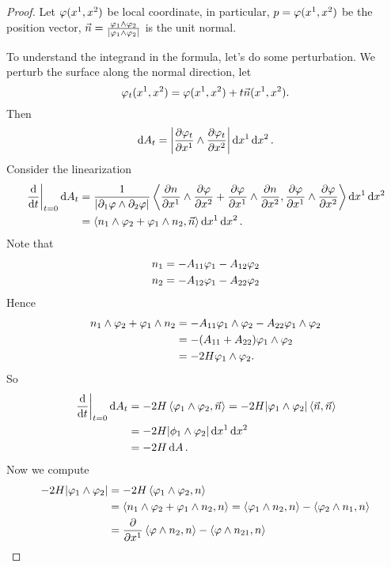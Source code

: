 \begin{proof}
    Let \(\varphi(x^1,x^2)\) be local coordinate, in particular, \(p=\varphi(x^1,x^2)\)
    be the position vector, \(\vec{n}=\frac{\varphi_1\wedge \varphi_2}{|\varphi_1\wedge
    \varphi_2|}\) is the unit normal.

    To understand the integrand in the formula, let's do some perturbation. We perturb
    the surface along the normal direction, let \[
        \varphi_t(x^1,x^2)=\varphi(x^1,x^2)+t\vec{n}(x^1,x^2)
    .\] Then \[
        \dd{A_t}=\left|\pdv{\varphi_t}{x^1}\wedge \pdv{\varphi_t}{x^2}\right|
        \dd{x^1}\dd{x^2}
    .\] Consider the linearization 
    \begin{align*}
        \eval{\dv{t}}_{t=0}\dd{A_t}&=\frac{1}{|\partial_1\vphi\wedge \partial_2\vphi|}
        \left<\pdv{n}{x^1}\wedge \pdv{\vphi}{x^2}+\pdv{\vphi}{x^1}\wedge \pdv{n}{x^2},
        \pdv{\vphi}{x^1}\wedge \pdv{\vphi}{x^2}\right> \dd{x^1}\dd{x^2} \\
        &=\left<n_1\wedge \vphi_2+\vphi_1\wedge n_2,\vec{n}\right> \dd{x^1}\dd{x^2}
    .\end{align*}
    Note that \begin{gather*}
        n_1=-A_{11}\varphi_1-A_{12}\varphi_2 \\
        n_2=-A_{12}\varphi_1-A_{22}\varphi_2
    \end{gather*}
    Hence \begin{align*}
        n_1\wedge \varphi_2+\varphi_1\wedge n_2&=-A_{11}\varphi_1\wedge \varphi_2-A_{22}\varphi_1
        \wedge \varphi_2 \\ 
        &=-(A_{11}+A_{22})\varphi_1\wedge \varphi_2 \\ 
        &=-2H\varphi_1\wedge \varphi_2
    .\end{align*}
    So \begin{align*}
        \eval{\dv{t}}_{t=0}\dd{A_t}&=-2H\left<\vphi_1\wedge \vphi_2,\vec n\right> 
        =-2H|\vphi_1\wedge \vphi_2|\left<\vec{n},\vec{n}\right> \\
        &=-2H|\phi_1\wedge \vphi_2|\dd{x^1}\dd{x^2} \\
        &=-2H\dd{A}
    .\end{align*}
    Now we compute
    \begin{align*}
        -2H|\vphi_1\wedge \vphi_2|&=-2H\left<\vphi_1\wedge \vphi_2,n\right> \\
        &=\left<n_1\wedge \vphi_2+\vphi_1\wedge n_2,n\right>
        =\left<\vphi_1\wedge n_2,n\right> -\left<\vphi_2\wedge n_1,n\right> \\
        &=\pdv{x^1}\left<\vphi\wedge n_2,n\right> -\left<\vphi\wedge n_{21},n\right> 

\end{align*}
\end{proof}
